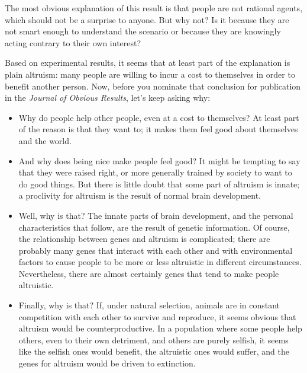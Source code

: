 \documentclass[12pt]{book}
\theoremstyle{exercise}
\begin{document}

The most obvious explanation of this result is that people are not rational agents, which should not be a surprise to anyone.  But why not?  Is it because they are not smart enough to understand the scenario or because they are knowingly acting contrary to their own interest?

Based on experimental results, it seems that at least part of the explanation is plain altruism: many people are willing to incur a cost to themselves in order to benefit another person.  Now, before you nominate that conclusion for publication in the {\it Journal of Obvious Results}, let's keep asking why:


\begin{itemize}

\item Why do people help other people, even at a cost to themselves?  At least part of the reason is that they want to; it makes them feel good about themselves and the world.

\item And why does being nice make people feel good?  It might be tempting to say that they were raised right, or more generally trained by society to want to do good things.  But there is little doubt that some part of altruism is innate; a proclivity for altruism is the result of normal brain development.

\item Well, why is that?  The innate parts of brain development, and the personal characteristics that follow, are the result of genetic information.  Of course, the relationship between genes and altruism is complicated; there are probably many genes that interact with each other and with environmental factors to cause people to be more or less altruistic in different circumstances.  Nevertheless, there are almost certainly genes that tend to make people altruistic.

\item Finally, why is that?  If, under natural selection, animals are in constant competition with each other to survive and reproduce, it seems obvious that altruism would be counterproductive.  In a population where some people help others, even to their own detriment, and others are purely selfish, it seems like the selfish ones would benefit, the altruistic ones would suffer, and the genes for altruism would be driven to extinction.

\end{itemize}
\end{document}
